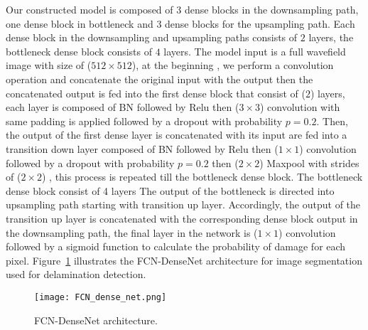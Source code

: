 	Our constructed model is composed of \(3\) dense blocks in the downsampling path, one dense block in bottleneck and 3 dense blocks for the upsampling path. 
	Each dense block in the downsampling and upsampling paths consists of \(2\) layers, the bottleneck dense block consists of \(4\) layers.
	The model input is a full wavefield image with size of (\(512\times 512\)), at the beginning , we perform a  convolution operation and concatenate the original input with the output then the concatenated output is fed into the first dense block that consist of (\(2\)) layers, each layer is composed of BN followed by Relu then (\(3\times3\)) convolution with same padding is applied followed by a dropout with probability \(p = 0.2\).
	Then, the output of the first dense layer is concatenated with its input are fed into a transition down layer composed of BN followed by Relu then (\(1\times1\)) convolution followed by a dropout with probability \(p = 0.2\) then (\(2\times2\)) Maxpool with strides of (\(2\times2\))  , this process is repeated till the bottleneck dense block.
	The bottleneck dense block consist of 4 layers
	The output of the bottleneck is directed into upsampling path starting with transition up layer.
	Accordingly, the output of the transition up layer is concatenated with the corresponding dense block output in the downsampling path, the final layer in the network is  (\(1\times1\)) convolution followed by a sigmoid function to calculate the probability of damage for each pixel.
	Figure~\ref{fcn} illustrates the FCN-DenseNet architecture for image segmentation used for delamination detection.
	\begin{figure} [h!]
		\begin{center}
			\texttt{[image: FCN\_dense\_net.png]}
		\end{center}
		\caption{FCN-DenseNet architecture.} 
		\label{fcn}
	\end{figure}


